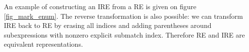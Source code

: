 \documentclass[AMA,STIX1COL]{WileyNJD-v2}
\begin{document}
An example of constructing an IRE from a RE is given on figure \ref{fig_mark_enum}.
The reverse transformation is also possible:
we can transform IRE back to RE
by erasing all indices
and adding parentheses around subexpressions with nonzero explicit submatch index.
Therefore RE and IRE are equivalent representations.
\\

%
\end{document}
